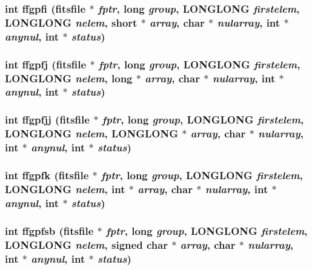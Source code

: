 \subsubsection{\setlength{\rightskip}{0pt plus 5cm}int ffgpfi (\bf{fitsfile} $\ast$ {\em fptr}, long {\em group}, \bf{LONGLONG} {\em firstelem}, \bf{LONGLONG} {\em nelem}, short $\ast$ {\em array}, char $\ast$ {\em nularray}, int $\ast$ {\em anynul}, int $\ast$ {\em status})}\label{fitsio__64_8h_f29072567714e2050dec2f834a1890c8}


\subsubsection{\setlength{\rightskip}{0pt plus 5cm}int ffgpfj (\bf{fitsfile} $\ast$ {\em fptr}, long {\em group}, \bf{LONGLONG} {\em firstelem}, \bf{LONGLONG} {\em nelem}, long $\ast$ {\em array}, char $\ast$ {\em nularray}, int $\ast$ {\em anynul}, int $\ast$ {\em status})}\label{fitsio__64_8h_348a086c25d23b4b453e20483c0552a2}


\subsubsection{\setlength{\rightskip}{0pt plus 5cm}int ffgpfjj (\bf{fitsfile} $\ast$ {\em fptr}, long {\em group}, \bf{LONGLONG} {\em firstelem}, \bf{LONGLONG} {\em nelem}, \bf{LONGLONG} $\ast$ {\em array}, char $\ast$ {\em nularray}, int $\ast$ {\em anynul}, int $\ast$ {\em status})}\label{fitsio__64_8h_b8dd1aed0cf184dd27347a3ad89bd888}


\subsubsection{\setlength{\rightskip}{0pt plus 5cm}int ffgpfk (\bf{fitsfile} $\ast$ {\em fptr}, long {\em group}, \bf{LONGLONG} {\em firstelem}, \bf{LONGLONG} {\em nelem}, int $\ast$ {\em array}, char $\ast$ {\em nularray}, int $\ast$ {\em anynul}, int $\ast$ {\em status})}\label{fitsio__64_8h_39fded4193b93f54f993961de406751f}


\subsubsection{\setlength{\rightskip}{0pt plus 5cm}int ffgpfsb (\bf{fitsfile} $\ast$ {\em fptr}, long {\em group}, \bf{LONGLONG} {\em firstelem}, \bf{LONGLONG} {\em nelem}, signed char $\ast$ {\em array}, char $\ast$ {\em nularray}, int $\ast$ {\em anynul}, int $\ast$ {\em status})}\label{fitsio__64_8h_d9472db2fdb501fccf5c65359329a9d6}


